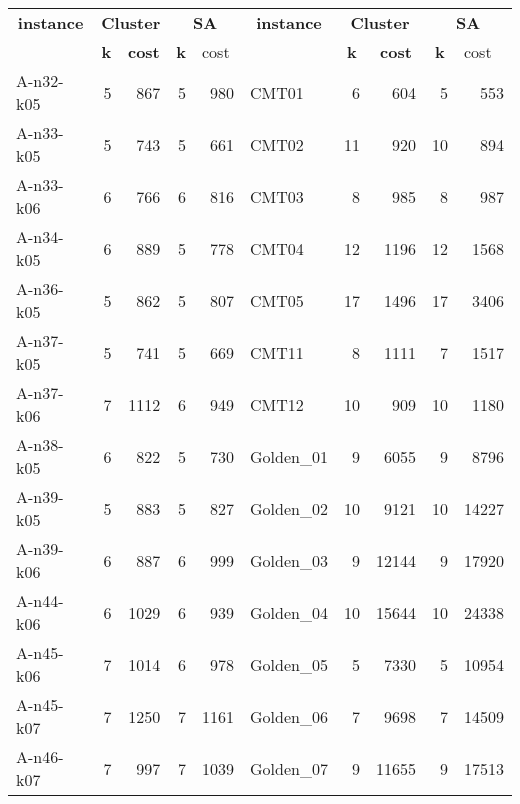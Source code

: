 \begin{table}[!h]
    \footnotesize

    \begin{center}
    \begin{tabular}{|l|r|r|r|r|l|r|r|r|r|}
    \hline
    \multicolumn{ 1}{|c|}{\textbf{instance}} & \multicolumn{ 2}{c|}{\textbf{Cluster}} & \multicolumn{ 2}{c|}{\textbf{SA}} & \multicolumn{ 1}{c|}{\textbf{instance}} & \multicolumn{ 2}{c|}{\textbf{Cluster}} & \multicolumn{ 2}{c|}{\textbf{SA}} \\ \cline{ 2- 5}\cline{ 7- 10}
    \multicolumn{ 1}{|c|}{} & \multicolumn{1}{c|}{\textbf{k}} & \multicolumn{1}{c|}{\textbf{cost}} & \multicolumn{1}{c|}{\textbf{k}} & \multicolumn{1}{l|}{cost} & \multicolumn{ 1}{c|}{} & \multicolumn{1}{c|}{\textbf{k}} & \multicolumn{1}{c|}{\textbf{cost}} & \multicolumn{1}{c|}{\textbf{k}} & \multicolumn{1}{l|}{cost} \\ \hline
    A-n32-k05 & 5 & 867 & 5 & 980 & CMT01 & 6 & 604 & 5 & 553 \\ \hline
    A-n33-k05 & 5 & 743 & 5 & 661 & CMT02 & 11 & 920 & 10 & 894 \\ \hline
    A-n33-k06 & 6 & 766 & 6 & 816 & CMT03 & 8 & 985 & 8 & 987 \\ \hline
    A-n34-k05 & 6 & 889 & 5 & 778 & CMT04 & 12 & 1196 & 12 & 1568 \\ \hline
    A-n36-k05 & 5 & 862 & 5 & 807 & CMT05 & 17 & 1496 & 17 & 3406 \\ \hline
    A-n37-k05 & 5 & 741 & 5 & 669 & CMT11 & 8 & 1111 & 7 & 1517 \\ \hline
    A-n37-k06 & 7 & 1112 & 6 & 949 & CMT12 & 10 & 909 & 10 & 1180 \\ \hline
    A-n38-k05 & 6 & 822 & 5 & 730 & Golden\_01 & 9 & 6055 & 9 & 8796 \\ \hline
    A-n39-k05 & 5 & 883 & 5 & 827 & Golden\_02 & 10 & 9121 & 10 & 14227 \\ \hline
    A-n39-k06 & 6 & 887 & 6 & 999 & Golden\_03 & 9 & 12144 & 9 & 17920 \\ \hline
    A-n44-k06 & 6 & 1029 & 6 & 939 & Golden\_04 & 10 & 15644 & 10 & 24338 \\ \hline
    A-n45-k06 & 7 & 1014 & 6 & 978 & Golden\_05 & 5 & 7330 & 5 & 10954 \\ \hline
    A-n45-k07 & 7 & 1250 & 7 & 1161 & Golden\_06 & 7 & 9698 & 7 & 14509 \\ \hline
    A-n46-k07 & 7 & 997 & 7 & 1039 & Golden\_07 & 9 & 11655 & 9 & 17513 \\ \hline

\end{tabular}
\end{center}
\end{table}
